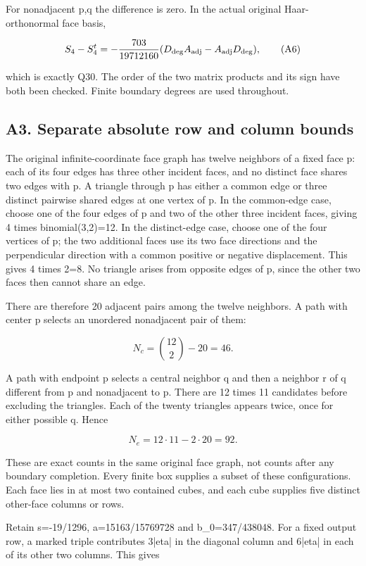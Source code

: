 \documentclass[11pt]{article}
\begin{document}
For nonadjacent p,q the difference is zero. In the actual original Haar-orthonormal face basis,

\[
 S_4-S_4^t=-\frac{703}{19712160}(D_{\rm deg}A_{\rm adj}-A_{\rm adj}D_{\rm deg}), \tag{A6}
\]

which is exactly Q30. The order of the two matrix products and its sign have both been checked. Finite boundary degrees are used throughout.

\subsection*{A3. Separate absolute row and column bounds}

The original infinite-coordinate face graph has twelve neighbors of a fixed face p: each of its four edges has three other incident faces, and no distinct face shares two edges with p. A triangle through p has either a common edge or three distinct pairwise shared edges at one vertex of p. In the common-edge case, choose one of the four edges of p and two of the other three incident faces, giving 4 times binomial(3,2)=12. In the distinct-edge case, choose one of the four vertices of p; the two additional faces use its two face directions and the perpendicular direction with a common positive or negative displacement. This gives 4 times 2=8. No triangle arises from opposite edges of p, since the other two faces then cannot share an edge.

There are therefore 20 adjacent pairs among the twelve neighbors. A path with center p selects an unordered nonadjacent pair of them:

\[
 N_c=\binom{12}{2}-20=46.
\]

A path with endpoint p selects a central neighbor q and then a neighbor r of q different from p and nonadjacent to p. There are 12 times 11 candidates before excluding the triangles. Each of the twenty triangles appears twice, once for either possible q. Hence

\[
 N_e=12\cdot11-2\cdot20=92. \tag{A7}
\]

These are exact counts in the same original face graph, not counts after any boundary completion. Every finite box supplies a subset of these configurations. Each face lies in at most two contained cubes, and each cube supplies five distinct other-face columns or rows.

Retain s=-19/1296, a=15163/15769728 and b\_0=347/438048. For a fixed output row, a marked triple contributes 3|eta| in the diagonal column and 6|eta| in each of its other two columns. This gives
\end{document}
